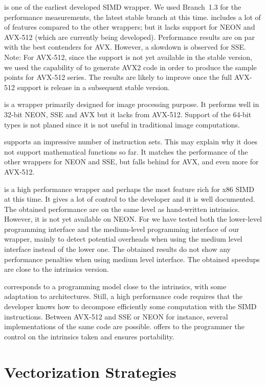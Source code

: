\textbf{\Vc} is one of the earliest developed SIMD \Cxx wrapper. We used
Branch~1.3 for the performance measurements, the latest stable branch at this
time. \Vc includes a lot of of features compared to the other wrappers; but it
lacks support for NEON and AVX-512 (which are currently being developed).
Performance results are on par with the best contenders for AVX. However, a
slowdown is observed for SSE. Note: For AVX-512, since the support is not yet
available in the stable version, we used the capability of \Vc to generate AVX2
code in order to produce the sample points for AVX-512 series. The results are
likely to improve once the full AVX-512 support is release in a subsequent
stable version.

\textbf{\TSIMD} is a wrapper primarily designed for image processing purpose.
It performs well in 32-bit NEON, SSE and AVX but it lacks from AVX-512. Support
of the 64-bit types is not planed since it is not useful in traditional image
computations.

\textbf{\simdpp} supports an impressive number of instruction
sets. This may explain why it does not support mathematical functions so far. It
matches the performance of the other wrappers for NEON and SSE, but falls behind
for AVX, and even more for AVX-512.

\textbf{\VCL} is a high performance wrapper and perhaps the most feature rich
for x86 SIMD at this time. It gives a lot of control to the developer and it is
well documented. The obtained performance are on the same level as hand-written
intrinsics. However, it is not yet available on NEON.
For \MIPP we have tested both the lower-level programming interface and the
medium-level programming interface of our \MIPP wrapper, mainly to detect
potential overheads when using the medium level interface instead of the lower
one. The obtained results do not show any performance penalties when using \MIPP
medium level interface. The obtained speedups are close to the intrinsics
version.

\textbf{\MIPP} corresponds to a programming model close to the intrinsics, with
some adaptation to architectures. Still, a high performance code requires that
the developer knows how to decompose efficiently some computation with the SIMD
instructions. Between AVX-512 and SSE or NEON for instance, several
implementations of the same code are possible. \MIPP offers to the programmer
the control on the intrinsics taken and ensures portability.

\section{Vectorization Strategies}
\label{sec:opt_vec}


